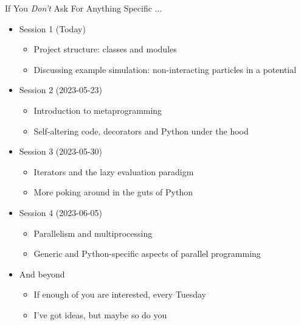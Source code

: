 \begin{frame}{If You \emph{Don't} Ask For Anything Specific ...}
%
\begin{itemize}
\item Session 1 (Today)
	\begin{itemize}
	\item Project structure: classes and modules
	\item Discussing example simulation: non-interacting particles in a potential
	\end{itemize}
\item Session 2 (2023-05-23)
	\begin{itemize}
	\item Introduction to metaprogramming
	\item Self-altering code, decorators and Python under the hood
	\end{itemize}
\item Session 3 (2023-05-30)
	\begin{itemize}
	\item Iterators and the lazy evaluation paradigm
	\item More poking around in the guts of Python
	\end{itemize}
\item Session 4 (2023-06-05)
	\begin{itemize}
	\item Parallelism and multiprocessing
	\item Generic and Python-specific aspects of parallel programming
	\end{itemize}
\item And beyond
	\begin{itemize}
	\item If enough of you are interested, every Tuesday
	\item I've got ideas, but maybe so do you
	\end{itemize}
\end{itemize}
%
\end{frame}


